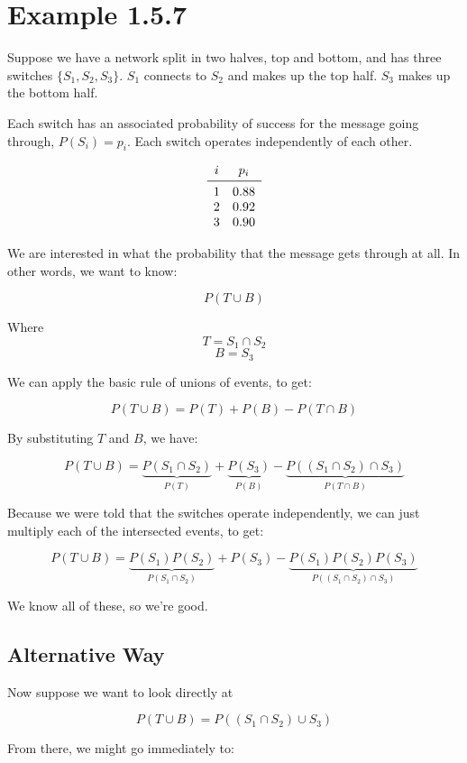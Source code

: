 \documentclass{article}
\begin{document}
\section*{Example 1.5.7}

Suppose we have a network split in two halves, top and bottom, and has
three switches $\{S_1,S_2,S_3\}$. $S_1$ connects to $S_2$ and makes up
the top half. $S_3$ makes up the bottom half.

Each switch has an associated probability of success for the message
going through, $P(S_i)=p_i$. Each switch operates independently of
each other.

\[
\begin{array}{cc}
i & p_i \\
\midrule
1 & 0.88 \\
2 & 0.92 \\
3 & 0.90 \\
\end{array}
\]

We are interested in what the probability that the message gets
through at all. In other words, we want to know:

\[
P(T\cup B)
\]

Where \[
T=S_1\cap S_2
\] \[
B=S_3
\]

We can apply the basic rule of unions of events, to get:

\[
P(T\cup B)=P(T)+P(B)-P(T\cap B)
\]

By substituting $T$ and $B$, we have:

\[
P(T\cup B)=\underbrace{P(S_1\cap S_2)}_{P(T)}+\underbrace{P(S_3)}_{P(B)}-\underbrace{P((S_1\cap S_2)\cap S_3)}_{P(T\cap B)}
\]

Because we were told that the switches operate independently, we can
just multiply each of the intersected events, to get:

\[
P(T\cup B)=
\underbrace{P(S_1)P(S_2)}_{P(S_1\cap S_2)}
+
P(S_3)
-
\underbrace{P(S_1)P(S_2)P(S_3)}_{P((S_1\cap S_2)\cap S_3)}
\]

We know all of these, so we're good.

\subsection*{Alternative Way}

Now suppose we want to look directly at

\[
P(T\cup B)=P((S_1\cap S_2)\cup S_3)
\]

From there, we might go immediately to:
\end{document}
